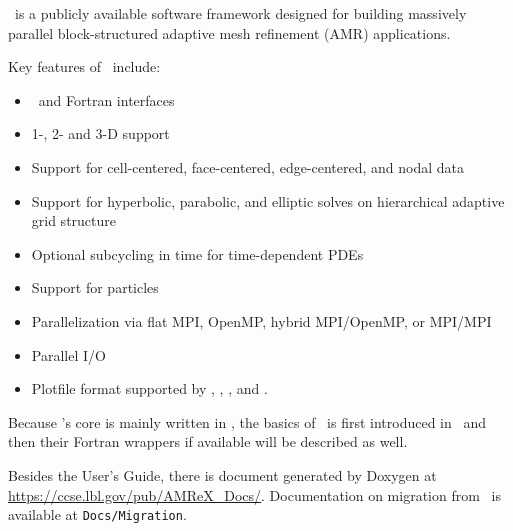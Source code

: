 \amrex\ is a publicly available software framework designed for
building massively parallel block-structured adaptive mesh refinement
(AMR) applications.

Key features of \amrex\ include:
\begin{itemize}
\item \cpp\ and Fortran interfaces
\item 1-, 2- and 3-D support
\item Support for cell-centered, face-centered, edge-centered, and
  nodal data
\item Support for hyperbolic, parabolic, and elliptic solves on
  hierarchical adaptive grid structure
\item Optional subcycling in time for time-dependent PDEs
\item Support for particles
\item Parallelization via flat MPI, OpenMP, hybrid MPI/OpenMP, or MPI/MPI
\item Parallel I/O
\item Plotfile format supported by \amrvis, \visit, \paraview, and \yt.
\end{itemize}

Because \amrex's core is mainly written in \cpp, the basics of \amrex\
is first introduced in \cpp\ and then their Fortran wrappers if
available will be described as well.  

Besides the User's Guide, there is document generated by Doxygen at
\url{https://ccse.lbl.gov/pub/AMReX_Docs/}.  Documentation on
migration from \boxlib\ is available at {\tt Docs/Migration}.
